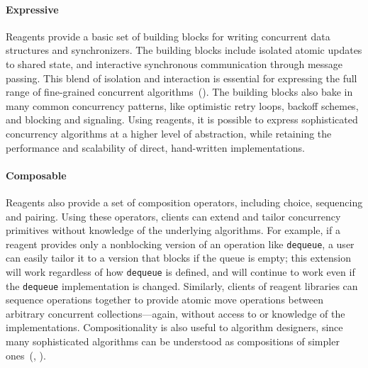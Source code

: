 \documentclass[preprint,nocopyrightspace]{sigplanconf}
\begin{document}



\paragraph{Expressive}  
Reagents provide a basic set of building blocks for writing concurrent data
structures and synchronizers.  The building blocks include isolated atomic
updates to shared state, and interactive synchronous communication through
message passing.  This blend of isolation and interaction is essential for
expressing the full range of fine-grained concurrent
algorithms~().  The building blocks also bake in many common
concurrency patterns, like optimistic retry loops, backoff schemes, and blocking
and signaling.  Using reagents, it is possible to express sophisticated
concurrency algorithms at a higher level of abstraction, while retaining the
performance and scalability of direct, hand-written implementations.

\paragraph{Composable}
Reagents also provide a set of composition operators, including choice,
sequencing and pairing.  Using these operators, clients can extend and tailor
concurrency primitives without knowledge of the underlying algorithms.  For
example, if a reagent provides only a nonblocking version of an operation like
\lstinline{dequeue}, a user can easily tailor it to a version that blocks if the
queue is empty; this extension will work regardless of how \lstinline{dequeue}
is defined, and will continue to work even if the \lstinline{dequeue}
implementation is changed.  Similarly, clients of reagent libraries can sequence
operations together to provide atomic move operations between arbitrary
concurrent collections---again, without access to or knowledge of the
implementations.  Compositionality is also useful to algorithm designers, since
many sophisticated algorithms can be understood as compositions of simpler
ones~(, ).
\end{document}
